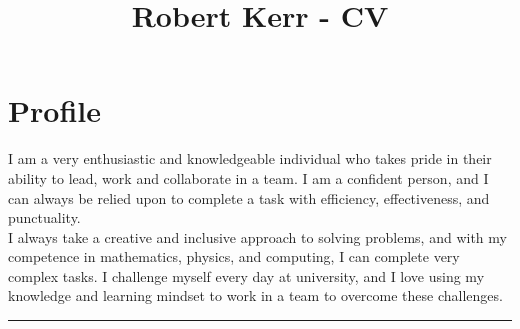 \documentclass[10pt,A4,english]{article}
\title{Robert Kerr - CV\vspace{-4em}}
\date{}
\begin{document}
\maketitle

%
%
\section*{Profile}
I am a very enthusiastic and knowledgeable individual who takes pride in their ability to lead, work and collaborate in a team. I am a confident person, and I can always be relied upon to complete a task with efficiency, effectiveness, and punctuality.\\
I always take a creative and inclusive approach to solving problems, and with my competence in mathematics, physics, and computing, I can complete very complex tasks. I challenge myself every day at university, and I love using my knowledge and learning mindset to work in a team to overcome these challenges.\\
\noindent\rule[0.5ex]{\linewidth}{1pt}

%
%


\end{document}
